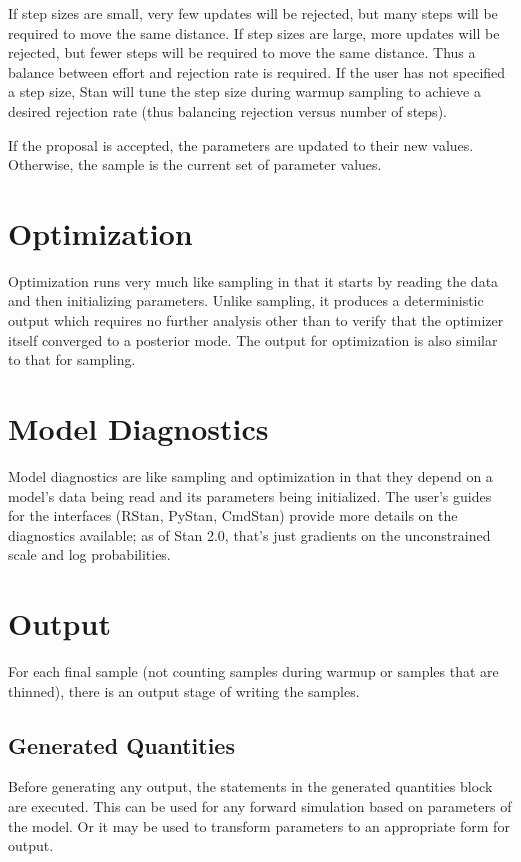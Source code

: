 If step sizes are small, very few updates will be rejected, but many
steps will be required to move the same distance.  If step sizes are
large, more updates will be rejected, but fewer steps will be required
to move the same distance.  Thus a balance between effort and
rejection rate is required.  If the user has not specified a step
size, Stan will tune the step size during warmup sampling to achieve
a desired rejection rate (thus balancing rejection versus number of
steps).

If the proposal is accepted, the parameters are updated to their new
values.  Otherwise, the sample is the current set of parameter values.


\section{Optimization}

Optimization runs very much like sampling in that it starts by reading
the data and then initializing parameters.  Unlike sampling, it
produces a deterministic output which requires no further analysis
other than to verify that the optimizer itself converged to a
posterior mode.  The output for optimization is also similar to that
for sampling.


\section{Model Diagnostics}

Model diagnostics are like sampling and optimization in that they
depend on a model's data being read and its parameters being
initialized.  The user's guides for the interfaces (RStan, PyStan,
CmdStan) provide more details on the diagnostics available; as of Stan
2.0, that's just gradients on the unconstrained scale and log
probabilities. 

\section{Output}

For each final sample (not counting samples during warmup or samples
that are thinned), there is an output stage of writing the samples.

\subsection{Generated Quantities} 

Before generating any output, the statements in the generated quantities 
block are executed.  This can be used for any forward simulation based
on parameters of the model.  Or it may be used to transform parameters
to an appropriate form for output.  

